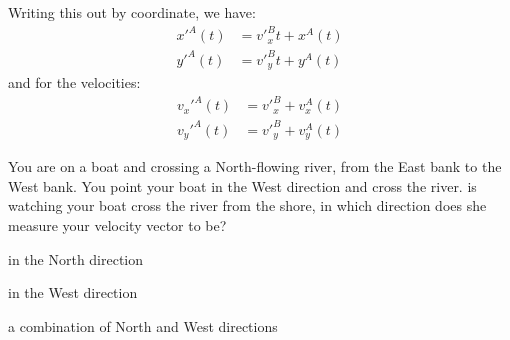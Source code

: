 
Writing this out by coordinate, we have:
\begin{align*}
x'^A(t)&=v'^B_xt+x^A(t)\\
y'^A(t)&=v'^B_yt+y^A(t)
\end{align*}
and for the velocities:
\begin{align*}
v_x'^A(t)&=v'^B_x+v_x^A(t)\\
v_y'^A(t)&=v'^B_y+v_y^A(t)
\end{align*}


\begin{checkpointMC}{You are on a boat and crossing a North-flowing river, from the East bank to the West bank. You point your boat in the West direction and cross the river. \chloe is watching your boat cross the river from the shore, in which direction does she measure your velocity vector to be?}
\item in the North direction
\item in the West direction
\item a combination of North and West directions
\end{checkpointMC}



